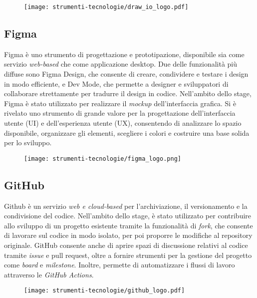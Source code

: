 \begin{figure}[H]
    \centering 
    \texttt{[image: strumenti-tecnologie/draw\_io\_logo.pdf]} 
\end{figure}

\subsection*{Figma}

\par Figma è uno strumento di progettazione e prototipazione, disponibile sia come servizio \textit{web-based} che come applicazione desktop. Due delle funzionalità più diffuse sono Figma Design, che consente di creare, condividere e testare i design in modo efficiente, e Dev Mode, che permette a designer e sviluppatori di collaborare strettamente per tradurre il design in codice. Nell’ambito dello stage, Figma è stato utilizzato per realizzare il \textit{mockup} dell’interfaccia grafica. Si è rivelato uno strumento di grande valore per la progettazione dell'interfaccia utente (UI) e dell’esperienza utente (UX), consentendo di analizzare lo spazio disponibile, organizzare gli elementi, scegliere i colori e costruire una base solida per lo sviluppo.

\begin{figure}[H]
    \centering 
    \texttt{[image: strumenti-tecnologie/figma\_logo.png]} 
\end{figure}

\subsection*{GitHub}

\par Github è un servizio \textit{web e cloud-based} per l'archiviazione, il versionamento e la condivisione del codice. Nell’ambito dello stage, è stato utilizzato per contribuire allo sviluppo di un progetto esistente tramite la funzionalità di \textit{fork}, che consente di lavorare sul codice in modo isolato, per poi proporre le modifiche al \gls{repository} originale. GitHub consente anche di aprire spazi di discussione relativi al codice tramite \textit{issue} e \gls{pull request}, oltre a fornire strumenti per la gestione del progetto come \textit{board} e \textit{milestone}. Inoltre, permette di automatizzare i flussi di lavoro attraverso le \textit{GitHub Actions}.

\begin{figure}[H]
    \centering 
    \texttt{[image: strumenti-tecnologie/github\_logo.pdf]} 
\end{figure}

